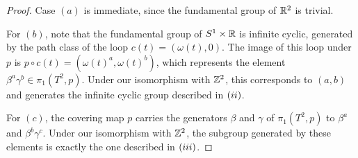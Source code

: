 \begin{proof}
Case $(a)$ is immediate, since the fundamental group of $\mathbb{R}^2$ is trivial.\par
For $(b)$, note that the fundamental group of $S^1\times\mathbb{R}$ is infinite cyclic, generated by the path class of the loop $c(t)=(\omega(t),0)$. The image of this loop under $p$ is $p\circ c(t)=(\omega(t)^a,\omega(t)^b)$, which represents the element $\beta^a\gamma^b\in\pi_1(T^2,p)$. Under our isomorphism with $\mathbb{Z}^2$, this corresponds to $(a,b)$ and generates the infinite cyclic group described in $(\rmnum{2})$.\par
For $(c)$, the covering map $p$ carries the generators $\beta$ and $\gamma$ of $\pi_1(T^2,p)$ to $\beta^a$ and $\beta^b\gamma^c$. Under our isomorphism with $\mathbb{Z}^2$, the subgroup generated by these elements is exactly the one described in $(\rmnum{3})$.
\end{proof}
